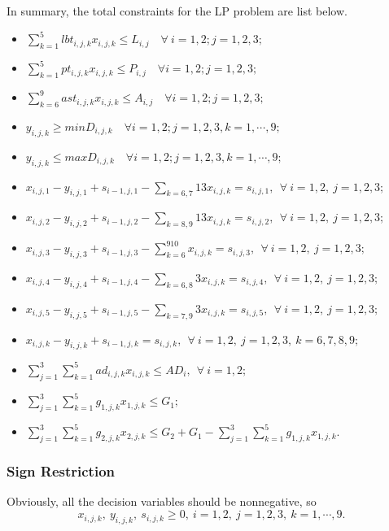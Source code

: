 \documentclass[12pt]{article}
\begin{document}
	\noindent In summary, the total constraints for the LP problem are list below.
	\begin{itemize}
		\item $\sum\limits_{k=1}^5lbt_{i,j,k}x_{i,j,k}\leq L_{i,j}\quad \forall\ i=1,2;j=1,2,3;$
		\item $\sum\limits_{k=1}^5pt_{i,j,k}x_{i,j,k}\leq P_{i,j}\quad \forall i=1,2;j=1,2,3;$
		\item $\sum\limits_{k=6}^9ast_{i,j,k}x_{i,j,k}\leq A_{i,j}\quad \forall i=1,2;j=1,2,3;$
		\item $y_{i,j,k}\geq minD_{i,j,k}\quad \forall i=1,2;j=1,2,3,k=1,\cdots,9;$
		\item $y_{i,j,k}\leq maxD_{i,j,k}\quad \forall i=1,2;j=1,2,3,k=1,\cdots,9;$
		\item $x_{i,j,1}-y_{i,j,1}+s_{i-1,j,1}-\sum\limits_{k=6,7}13x_{i,j,k}= s_{i,j,1},\ \ \forall\ i=1,2,\ j=1,2,3;$
		\item $x_{i,j,2}-y_{i,j,2}+s_{i-1,j,2}-\sum\limits_{k=8,9}13x_{i,j,k} = s_{i,j,2},\ \ \forall\ i=1,2,\ j=1,2,3;$
		\item $x_{i,j,3}-y_{i,j,3}+s_{i-1,j,3}-\sum\limits_{k=6}^910x_{i,j,k} = s_{i,j,3},\ \ \forall\ i=1,2,\ j=1,2,3;$
		\item $x_{i,j,4}-y_{i,j,4}+s_{i-1,j,4}-\sum\limits_{k=6,8}3x_{i,j,k} = s_{i,j,4},\ \ \forall\ i=1,2,\ j=1,2,3;$
		\item $x_{i,j,5}-y_{i,j,5}+s_{i-1,j,5}-\sum\limits_{k=7,9}3x_{i,j,k} = s_{i,j,5},\ \ \forall\ i=1,2,\ j=1,2,3;$
		\item $x_{i,j,k}-y_{i,j,k}+s_{i-1,j,k} = s_{i,j,k},\ \ \forall\ i=1,2,\ j=1,2,3,\ k=6,7,8,9;$
		\item $\sum\limits_{j=1}^3\sum\limits_{k=1}^5ad_{i,j,k}x_{i,j,k}\le AD_i,\ \ \forall\ i=1,2;$
		\item $\sum\limits_{j=1}^3\sum\limits_{k=1}^5g_{1,j,k}x_{1,j,k}\leq G_1;$
		\item $\sum\limits_{j=1}^3\sum\limits_{k=1}^5g_{2,j,k}x_{2,j,k}\leq G_2+G_1-\sum\limits_{j=1}^3\sum\limits_{k=1}^5g_{1,j,k}x_{1,j,k}.$
	\end{itemize}
	\subsubsection{Sign Restriction}
	Obviously, all the decision variables should be nonnegative, so
	\begin{equation}
		\label{eq16}
		x_{i,j,k},\ y_{i,j,k},\ s_{i,j,k}\geq 0,\ i=1,2,\ j=1,2,3,\ k=1,\cdots,9.
	\end{equation}
\end{document}
